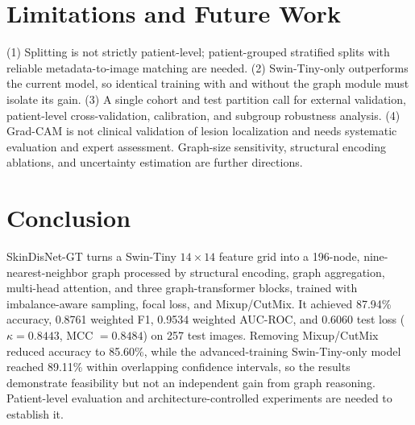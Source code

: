 \documentclass[conference]{IEEEtran}
\begin{document}
\section{Limitations and Future Work}
(1) Splitting is not strictly patient-level; patient-grouped stratified splits with reliable metadata-to-image matching are needed. (2) Swin-Tiny-only outperforms the current model, so identical training with and without the graph module must isolate its gain. (3) A single cohort and test partition call for external validation, patient-level cross-validation, calibration, and subgroup robustness analysis. (4) Grad-CAM is not clinical validation of lesion localization and needs systematic evaluation and expert assessment. Graph-size sensitivity, structural encoding ablations, and uncertainty estimation are further directions.

\section{Conclusion}
SkinDisNet-GT turns a Swin-Tiny $14\times14$ feature grid into a 196-node, nine-nearest-neighbor graph processed by structural encoding, graph aggregation, multi-head attention, and three graph-transformer blocks, trained with imbalance-aware sampling, focal loss, and Mixup/CutMix. It achieved 87.94\% accuracy, 0.8761 weighted F1, 0.9534 weighted AUC-ROC, and 0.6060 test loss ($\kappa=0.8443$, MCC $=0.8484$) on 257 test images. Removing Mixup/CutMix reduced accuracy to 85.60\%, while the advanced-training Swin-Tiny-only model reached 89.11\% within overlapping confidence intervals, so the results demonstrate feasibility but not an independent gain from graph reasoning. Patient-level evaluation and architecture-controlled experiments are needed to establish it.
\end{document}
